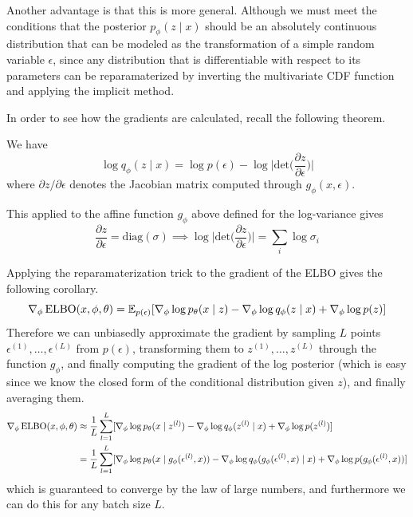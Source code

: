   Another advantage is that this is more general. Although we must meet the conditions that the posterior $p_\phi (z \mid x)$ should be an absolutely continuous distribution that can be modeled as the transformation of a simple random variable $\epsilon$, since any distribution that is differentiable with respect to its parameters can be reparamaterized by inverting the multivariate CDF function and applying the implicit method. 

  In order to see how the gradients are calculated, recall the following theorem. 

  \begin{theorem}
    We have 
    \begin{equation}
      \log q_\phi (z \mid x) = \log p(\epsilon) - \log \bigg| \mathrm{det} \bigg( \frac{\partial z}{\partial \epsilon}\bigg)\bigg| 
    \end{equation}
    where $\partial z / \partial \epsilon$ denotes the Jacobian matrix computed through $g_\phi(x, \epsilon)$. 
  \end{theorem}
  
  \begin{corollary}
    This applied to the affine function $g_\phi$ above defined for the log-variance gives 
    \begin{equation}
      \frac{\partial z}{\partial \epsilon} = \mathrm{diag}(\sigma) \implies \log \bigg| \mathrm{det} \bigg( \frac{\partial z}{\partial \epsilon}\bigg)\bigg| = \sum_i \log \sigma_i
    \end{equation}
  \end{corollary}

  \begin{corollary}
    Applying the reparamaterization trick to the gradient of the ELBO gives the following corollary. 
    \begin{equation}
      \nabla_\phi \elbo(x, \phi, \theta) = \mathbb{E}_{p(\epsilon)}[\nabla_\phi \log p_\theta (x \mid z) - \nabla_\phi \log q_\phi (z \mid x) + \nabla_\phi \log p(z)]
    \end{equation}
    Therefore we can unbiasedly approximate the gradient by sampling $L$ points $\epsilon^{(1)}, \ldots, \epsilon^{(L)}$ from $p(\epsilon)$, transforming them to $z^{(1)}, \ldots, z^{(L)}$ through the function $g_\phi$, and finally computing the gradient of the log posterior (which is easy since we know the closed form of the conditional distribution given $z$), and finally averaging them. 
    \begin{align*}
      \nabla_\phi \elbo(x, \phi, \theta) & \approx \frac{1}{L} \sum_{l=1}^L [\nabla_\phi \log p_\theta (x \mid z^{(l)}) - \nabla_\phi \log q_\phi (z^{(l)} \mid x) + \nabla_\phi \log p(z^{(l)})] \\
                                         & = \frac{1}{L} \sum_{l=1}^L [\nabla_\phi \log p_\theta (x \mid g_\phi (\epsilon^{(l)}, x)) - \nabla_\phi \log q_\phi (g_\phi (\epsilon^{(l)}, x) \mid x) + \nabla_\phi \log p(g_\phi (\epsilon^{(l)}, x))]
    \end{align*}
    which is guaranteed to converge by the law of large numbers, and furthermore we can do this for any batch size $L$. 
  \end{corollary}


